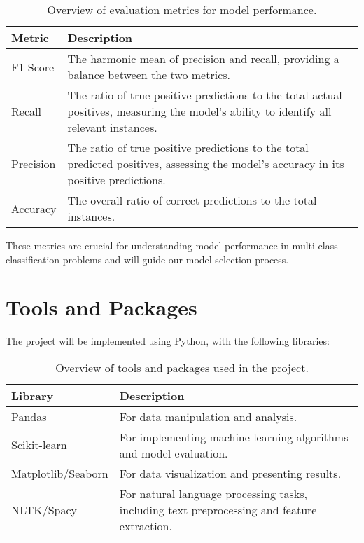 \documentclass[runningheads]{llncs}
\begin{document}
\begin{table}[h!]
    \centering
    \begin{tabular}{|l|p{10cm}|}
        \hline
        \textbf{Metric} & \textbf{Description} \\ \hline
        F1 Score & The harmonic mean of precision and recall, providing a balance between the two metrics. \\ \hline
        Recall & The ratio of true positive predictions to the total actual positives, measuring the model's ability to identify all relevant instances. \\ \hline
        Precision & The ratio of true positive predictions to the total predicted positives, assessing the model's accuracy in its positive predictions. \\ \hline
        Accuracy & The overall ratio of correct predictions to the total instances. \\ \hline
    \end{tabular}
    \caption{Overview of evaluation metrics for model performance.}
    \label{tab:metrics}
\end{table}

These metrics are crucial for understanding model performance in multi-class classification problems 
and will guide our model selection process.

\section{Tools and Packages}
The project will be implemented using Python, with the following libraries:

\begin{table}[h!]
    \centering
    \begin{tabular}{|l|p{10cm}|}
        \hline
        \textbf{Library} & \textbf{Description} \\ \hline
        Pandas & For data manipulation and analysis. \\ \hline
        Scikit-learn & For implementing machine learning algorithms and model evaluation. \\ \hline
        Matplotlib/Seaborn & For data visualization and presenting results. \\ \hline
        NLTK/Spacy & For natural language processing tasks, including text preprocessing and feature extraction. \\ \hline
    \end{tabular}
    \caption{Overview of tools and packages used in the project.}
    \label{tab:tools}
\end{table}
\end{document}
